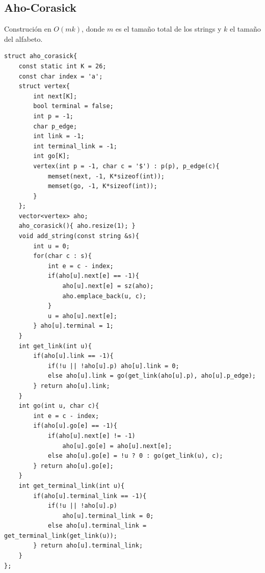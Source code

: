 \subsection{Aho-Corasick}
Construción en $O(mk)$, donde $m$ es el tamaño total de los strings y $k$ el tamaño del alfabeto.
\begin{verbatim}
struct aho_corasick{
    const static int K = 26;
    const char index = 'a';
    struct vertex{
        int next[K];
        bool terminal = false;
        int p = -1;
        char p_edge;
        int link = -1;
        int terminal_link = -1;
        int go[K];
        vertex(int p = -1, char c = '$') : p(p), p_edge(c){
            memset(next, -1, K*sizeof(int));
            memset(go, -1, K*sizeof(int));
        }
    };
    vector<vertex> aho;
    aho_corasick(){ aho.resize(1); }
    void add_string(const string &s){
        int u = 0;
        for(char c : s){
            int e = c - index;
            if(aho[u].next[e] == -1){
                aho[u].next[e] = sz(aho);
                aho.emplace_back(u, c);
            }
            u = aho[u].next[e];
        } aho[u].terminal = 1;
    }
    int get_link(int u){
        if(aho[u].link == -1){
            if(!u || !aho[u].p) aho[u].link = 0;
            else aho[u].link = go(get_link(aho[u].p), aho[u].p_edge);
        } return aho[u].link;
    }
    int go(int u, char c){
        int e = c - index;
        if(aho[u].go[e] == -1){
            if(aho[u].next[e] != -1)
                aho[u].go[e] = aho[u].next[e];
            else aho[u].go[e] = !u ? 0 : go(get_link(u), c);
        } return aho[u].go[e];
    }
    int get_terminal_link(int u){
        if(aho[u].terminal_link == -1){
            if(!u || !aho[u].p)
                aho[u].terminal_link = 0;
            else aho[u].terminal_link = get_terminal_link(get_link(u));
        } return aho[u].terminal_link;
    }
};
\end{verbatim}



